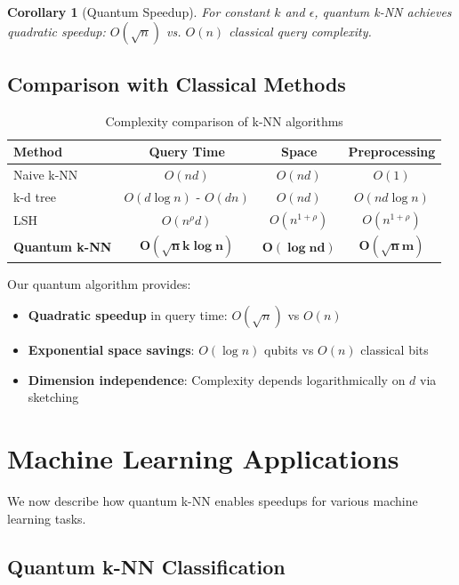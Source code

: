 \documentclass[11pt]{article}
\newtheorem{corollary}[theorem]{Corollary}
\begin{document}
\begin{corollary}[Quantum Speedup]
For constant $k$ and $\epsilon$, quantum k-NN achieves quadratic speedup: $O(\sqrt{n})$ vs. $O(n)$ classical query complexity.
\end{corollary}

\subsection{Comparison with Classical Methods}

\begin{table}[ht]
\centering
\caption{Complexity comparison of k-NN algorithms}
\begin{tabular}{lccc}
\toprule
\textbf{Method} & \textbf{Query Time} & \textbf{Space} & \textbf{Preprocessing} \\
\midrule
Naive k-NN & $O(nd)$ & $O(nd)$ & $O(1)$ \\
k-d tree & $O(d \log n)$ - $O(dn)$ & $O(nd)$ & $O(nd \log n)$ \\
LSH & $O(n^{\rho} d)$ & $O(n^{1+\rho})$ & $O(n^{1+\rho})$ \\
\textbf{Quantum k-NN} & $\mathbf{O(\sqrt{n}k\log n)}$ & $\mathbf{O(\log nd)}$ & $\mathbf{O(\sqrt{n}m)}$ \\
\bottomrule
\end{tabular}
\label{tab:complexity_comparison}
\end{table}

Our quantum algorithm provides:
\begin{itemize}
    \item \textbf{Quadratic speedup} in query time: $O(\sqrt{n})$ vs $O(n)$
    \item \textbf{Exponential space savings}: $O(\log n)$ qubits vs $O(n)$ classical bits
    \item \textbf{Dimension independence}: Complexity depends logarithmically on $d$ via sketching
\end{itemize}

\section{Machine Learning Applications}
\label{sec:ml_applications}

We now describe how quantum k-NN enables speedups for various machine learning tasks.

\subsection{Quantum k-NN Classification}
\end{document}
